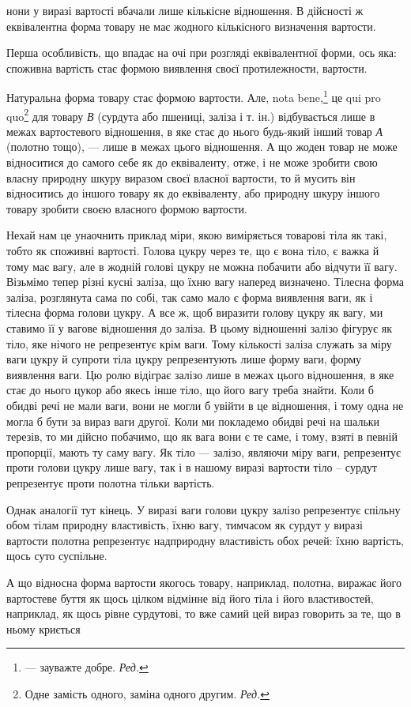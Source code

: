 \parcont{}  %
нони у виразі вартості вбачали лише кількісне відношення. В дійсності ж еквівалентна форма товару не
має жодного кількісного визначення вартости.

Перша особливість, що впадає на очі при розгляді еквівалентної форми, ось яка: споживна вартість
стає формою виявлення своєї протилежности, вартости.

Натуральна форма товару стає формою вартости. Але, nota bene,\footnote*{
— зауважте добре. \emph{Ред.}
} це qui pro quo\footnote*{
Одне замість одного, заміна одного другим. \emph{Ред.}
} для товару \emph{В}
(сурдута або пшениці, заліза і т. ін.) відбувається лише в межах вартостевого відношення, в яке стає
до нього будь-який інший товар \emph{А} (полотно тощо), — лише в межах цього відношення. А що жоден товар
не може відноситися до самого себе як до еквіваленту, отже, і не може зробити свою власну природну
шкуру виразом своєї власної вартости, то й мусить він відноситись до іншого товару як до
еквіваленту, або природну шкуру іншого товару зробити своєю власного формою вартости.

Нехай нам це унаочнить приклад міри, якою виміряється товарові тіла як такі, тобто як споживні
вартості. Голова цукру через те, що є вона тіло, є важка й тому має вагу, але в жодній голові цукру
не можна побачити або відчути її вагу. Візьмімо тепер різні кусні заліза, що їхню вагу наперед
визначено. Тілесна форма заліза, розглянута сама по собі, так само мало є форма виявлення ваги, як і
тілесна форма голови цукру. А все ж, щоб виразити голову цукру як вагу, ми ставимо її у вагове
відношення до заліза. В цьому відношенні залізо фігурує як тіло, яке нічого не репрезентує крім
ваги. Тому кількості заліза служать за міру ваги цукру й супроти тіла цукру репрезентують лише форму
ваги, форму виявлення ваги. Цю ролю відіграє залізо лише в межах цього відношення, в яке стає до
нього цукор або якесь інше тіло, що його вагу треба знайти. Коли б обидві речі не мали ваги, вони не
могли б увійти в це відношення, і тому одна не могла б бути за вираз ваги другої. Коли ми покладемо
обидві речі на шальки терезів, то ми дійсно побачимо, що як вага вони є те саме, і тому, взяті в
певній пропорції, мають ту саму вагу. Як тіло — залізо, являючи міру ваги, репрезентує проти голови
цукру лише вагу, так і в нашому виразі вартости тіло – сурдут репрезентує проти полотна тільки
вартість.

Однак аналогії тут кінець. У виразі ваги голови цукру залізо репрезентує спільну обом тілам природну
властивість, їхню вагу, тимчасом як сурдут у виразі вартости полотна репрезентує надприродну
властивість обох речей: їхню вартість, щось суто суспільне.

А що відносна форма вартости якогось товару, наприклад,
полотна, виражає його вартостеве буття як щось цілком відмінне від його тіла і його властивостей,
наприклад, як щось рівне сурдутові, то вже самий цей вираз говорить за те, що в ньому криється
\parbreak{}  %
